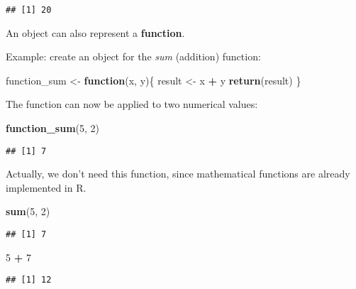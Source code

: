 \documentclass[
]{article}
\newenvironment{Shaded}{\begin{snugshade}}{\end{snugshade}}
\newcommand{\ControlFlowTok}[1]{\textcolor[rgb]{0.13,0.29,0.53}{\textbf{#1}}}
\newcommand{\DecValTok}[1]{\textcolor[rgb]{0.00,0.00,0.81}{#1}}
\newcommand{\FunctionTok}[1]{\textcolor[rgb]{0.13,0.29,0.53}{\textbf{#1}}}
\newcommand{\NormalTok}[1]{#1}
\newcommand{\OtherTok}[1]{\textcolor[rgb]{0.56,0.35,0.01}{#1}}
\newcommand{\SpecialCharTok}[1]{\textcolor[rgb]{0.81,0.36,0.00}{\textbf{#1}}}
\begin{document}
\begin{verbatim}
## [1] 20
\end{verbatim}

An object can also represent a \textbf{function}.

Example: create an object for the \emph{sum} (addition) function:

\begin{Shaded}
\begin{Highlighting}[]
\NormalTok{function\_sum }\OtherTok{\textless{}{-}} \ControlFlowTok{function}\NormalTok{(x, y)\{}
\NormalTok{  result }\OtherTok{\textless{}{-}}\NormalTok{ x }\SpecialCharTok{+}\NormalTok{ y}
  \FunctionTok{return}\NormalTok{(result)}
\NormalTok{\}}
\end{Highlighting}
\end{Shaded}

The function can now be applied to two numerical values:

\begin{Shaded}
\begin{Highlighting}[]
\FunctionTok{function\_sum}\NormalTok{(}\DecValTok{5}\NormalTok{, }\DecValTok{2}\NormalTok{)}
\end{Highlighting}
\end{Shaded}

\begin{verbatim}
## [1] 7
\end{verbatim}

Actually, we don't need this function, since mathematical functions are already implemented in R.

\begin{Shaded}
\begin{Highlighting}[]
\FunctionTok{sum}\NormalTok{(}\DecValTok{5}\NormalTok{, }\DecValTok{2}\NormalTok{)}
\end{Highlighting}
\end{Shaded}

\begin{verbatim}
## [1] 7
\end{verbatim}

\begin{Shaded}
\begin{Highlighting}[]
\DecValTok{5} \SpecialCharTok{+} \DecValTok{7}
\end{Highlighting}
\end{Shaded}

\begin{verbatim}
## [1] 12
\end{verbatim}
\end{document}
